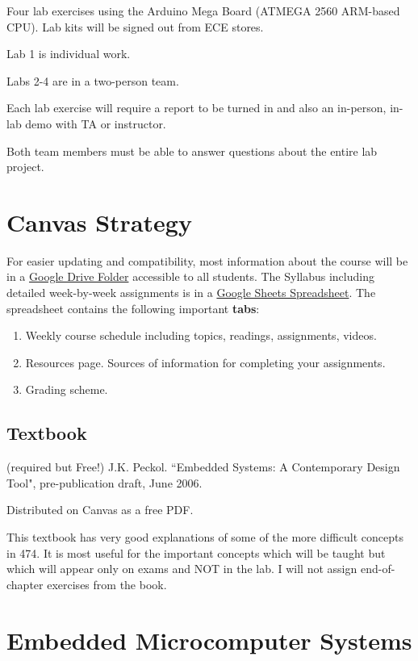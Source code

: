 \documentclass{article}	%
\begin{document}
Four lab exercises using the Arduino Mega Board (ATMEGA 2560 ARM-based CPU).   Lab kits will be signed out from
ECE stores.

Lab 1 is individual work.

Labs 2-4 are in a two-person team. 

Each lab exercise will require a report to be turned in and also an in-person, in-lab demo with TA or instructor.

Both team members must be able to answer questions about the entire lab project. 



\section{Canvas Strategy}
For easier updating and compatibility, most information about the course will be in a 
\href{https://drive.google.com/drive/u/1/folders/1fiYQZ4aIYyq9MIifMRhXioKQF0ENuCZ5}{Google Drive Folder} 
accessible to all students.   The Syllabus including detailed week-by-week 
assignments is in a 
\href{https://docs.google.com/spreadsheets/d/1pLo5GvlvPP_WHET6sbK7IhZyR_x2ABR-7OutT0kR_mc/edit?usp=sharing} {Google Sheets Spreadsheet}.   
The spreadsheet contains the following important {\bf tabs}:
\begin{enumerate}
    \item Weekly course schedule including topics, readings, assignments, videos.
    \item Resources page.  Sources of information for completing your assignments.
    \item Grading scheme. 
\end{enumerate}
 

\subsection{Textbook}
(required but Free!)
 J.K. Peckol. ``Embedded Systems: A Contemporary Design Tool",
pre-publication draft, June 2006.   

Distributed on Canvas as a free 
PDF. 

This textbook has very good explanations of some of the more difficult concepts in
474.  It is most useful for the important concepts which will be taught but which
will appear only on exams and NOT in the lab.
I will not assign end-of-chapter exercises from the book.


\section{Embedded Microcomputer Systems}
\end{document}

